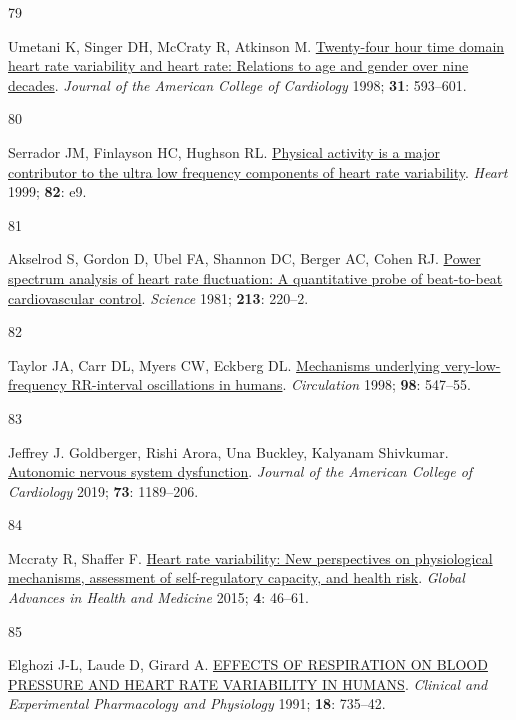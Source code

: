 \documentclass[
  a4paper,
  headsepline=true,
  open=any]{scrbook}
\newlength{\cslhangindent}
\newlength{\csllabelwidth}
\newlength{\cslentryspacingunit} %
\newenvironment{CSLReferences}[2] %
 {%
  \setlength{\parindent}{0pt}
  \ifodd #1
  \let\oldpar\par
  \def\par{\hangindent=\cslhangindent\oldpar}
  \fi
  \setlength{\parskip}{#2\cslentryspacingunit}
 }%
 {}
\newcommand{\CSLLeftMargin}[1]{\parbox[t]{\csllabelwidth}{#1}}
\newcommand{\CSLRightInline}[1]{\parbox[t]{\linewidth - \csllabelwidth}{#1}\break}
\begin{document}
\begin{CSLReferences}{0}{0}
\leavevmode{}%
\CSLLeftMargin{79 }%
\CSLRightInline{Umetani K, Singer DH, McCraty R, Atkinson M.
\href{https://doi.org/10.1016/S0735-1097(97)00554-8}{Twenty-four hour
time domain heart rate variability and heart rate: Relations to age and
gender over nine decades}. \emph{Journal of the American College of
Cardiology} 1998; \textbf{31}: 593--601.}

\leavevmode{}%
\CSLLeftMargin{80 }%
\CSLRightInline{Serrador JM, Finlayson HC, Hughson RL.
\href{https://doi.org/10.1136/hrt.82.6.e9}{Physical activity is a major
contributor to the ultra low frequency components of heart rate
variability}. \emph{Heart} 1999; \textbf{82}: e9.}

\leavevmode{}%
\CSLLeftMargin{81 }%
\CSLRightInline{Akselrod S, Gordon D, Ubel FA, Shannon DC, Berger AC,
Cohen RJ. \href{https://doi.org/10.1126/science.6166045}{Power spectrum
analysis of heart rate fluctuation: A quantitative probe of beat-to-beat
cardiovascular control}. \emph{Science} 1981; \textbf{213}: 220--2.}

\leavevmode{}%
\CSLLeftMargin{82 }%
\CSLRightInline{Taylor JA, Carr DL, Myers CW, Eckberg DL.
\href{https://doi.org/10.1161/01.CIR.98.6.547}{Mechanisms underlying
very-low-frequency RR-interval oscillations in humans}.
\emph{Circulation} 1998; \textbf{98}: 547--55.}

\leavevmode{}%
\CSLLeftMargin{83 }%
\CSLRightInline{Jeffrey J. Goldberger, Rishi Arora, Una Buckley,
Kalyanam Shivkumar.
\href{https://doi.org/doi:10.1016/j.jacc.2018.12.064}{Autonomic nervous
system dysfunction}. \emph{Journal of the American College of
Cardiology} 2019; \textbf{73}: 1189--206.}

\leavevmode{}%
\CSLLeftMargin{84 }%
\CSLRightInline{Mccraty R, Shaffer F.
\href{https://doi.org/10.7453/gahmj.2014.073}{Heart rate variability:
New perspectives on physiological mechanisms, assessment of
self-regulatory capacity, and health risk}. \emph{Global Advances in
Health and Medicine} 2015; \textbf{4}: 46--61.}

\leavevmode{}%
\CSLLeftMargin{85 }%
\CSLRightInline{Elghozi J-L, Laude D, Girard A.
\href{https://doi.org/10.1111/j.1440-1681.1991.tb01391.x}{EFFECTS OF
RESPIRATION ON BLOOD PRESSURE AND HEART RATE VARIABILITY IN HUMANS}.
\emph{Clinical and Experimental Pharmacology and Physiology} 1991;
\textbf{18}: 735--42.}


\end{CSLReferences}
\end{document}
